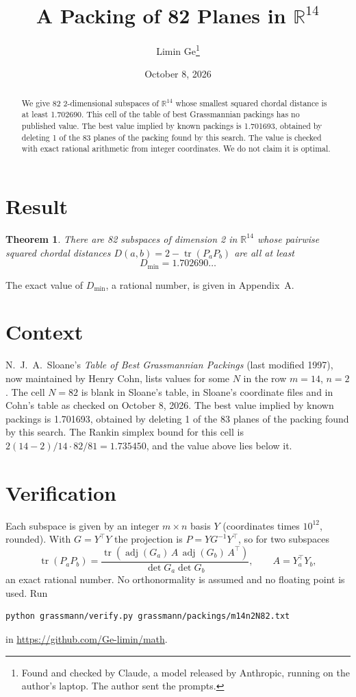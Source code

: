 \documentclass[11pt,a4paper]{article}
\title{A Packing of 82 Planes in $\mathbb{R}^{14}$}
\author{Limin Ge\thanks{Found and checked by Claude, a model released by Anthropic, running on the author's laptop. The author sent the prompts.}}
\date{October 8, 2026}
\newtheorem*{theorem}{Theorem}
\begin{document}
\maketitle
\begin{abstract}
We give 82 2-dimensional subspaces of $\mathbb{R}^{14}$ whose smallest squared chordal distance is at least 1.702690. This cell of the table of best Grassmannian packings has no published value. The best value implied by known packings is 1.701693, obtained by deleting 1 of the 83 planes of the packing found by this search. The value is checked with exact rational arithmetic from integer coordinates. We do not claim it is optimal.
\end{abstract}

\section{Result}
\begin{theorem}
There are 82 subspaces of dimension 2 in $\mathbb{R}^{14}$ whose pairwise squared chordal distances $D(a,b) = 2 - \operatorname{tr}(P_aP_b)$ are all at least
\[ D_{\min} = 1.702690\ldots \]
\end{theorem}
The exact value of $D_{\min}$, a rational number, is given in Appendix~A.


\section{Context}
N.~J.~A.~Sloane's \emph{Table of Best Grassmannian Packings} (last modified 1997), now maintained by Henry Cohn, lists values for some $N$ in the row $m=14$, $n=2$. The cell $N=82$ is blank in Sloane's table, in Sloane's coordinate files and in Cohn's table as checked on October 8, 2026. The best value implied by known packings is 1.701693, obtained by deleting 1 of the 83 planes of the packing found by this search. The Rankin simplex bound for this cell is $2(14-2)/14\cdot 82/81 = 1.735450$, and the value above lies below it.


\section{Verification}
Each subspace is given by an integer $m\times n$ basis $Y$ (coordinates times $10^{12}$, rounded). With $G=Y^\top Y$ the projection is $P=YG^{-1}Y^\top$, so for two subspaces
\[ \operatorname{tr}(P_aP_b)=\frac{\operatorname{tr}(\operatorname{adj}(G_a)\,A\,\operatorname{adj}(G_b)\,A^\top)}{\det G_a\det G_b},\qquad A=Y_a^\top Y_b, \]
an exact rational number. No orthonormality is assumed and no floating point is used. Run
\begin{verbatim}
python grassmann/verify.py grassmann/packings/m14n2N82.txt
\end{verbatim}
in \url{https://github.com/Ge-limin/math}.
\end{document}
